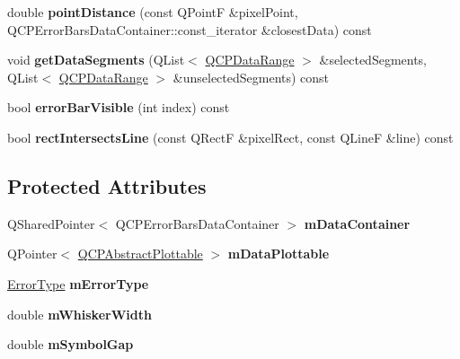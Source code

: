 \begin{DoxyCompactItemize}
\item 
\mbox{\label{classQCPErrorBars_a8e904076bad643f43af28b95f21c1b88}} 
double {\bfseries point\+Distance} (const Q\+PointF \&pixel\+Point, Q\+C\+P\+Error\+Bars\+Data\+Container\+::const\+\_\+iterator \&closest\+Data) const
\item 
\mbox{\label{classQCPErrorBars_a243e0bb2563fc2e9f08efd77e7175abf}} 
void {\bfseries get\+Data\+Segments} (Q\+List$<$ \hyperlink{classQCPDataRange}{Q\+C\+P\+Data\+Range} $>$ \&selected\+Segments, Q\+List$<$ \hyperlink{classQCPDataRange}{Q\+C\+P\+Data\+Range} $>$ \&unselected\+Segments) const
\item 
\mbox{\label{classQCPErrorBars_a5ad9abccb1be3df25485ad7dc21b3b89}} 
bool {\bfseries error\+Bar\+Visible} (int index) const
\item 
\mbox{\label{classQCPErrorBars_aa9b1642567a0aff8a2f6e0556c563633}} 
bool {\bfseries rect\+Intersects\+Line} (const Q\+RectF \&pixel\+Rect, const Q\+LineF \&line) const
\end{DoxyCompactItemize}
\subsection*{Protected Attributes}
\begin{DoxyCompactItemize}
\item 
\mbox{\label{classQCPErrorBars_a83c7f452d0eebd302a7e4fb3a1957634}} 
Q\+Shared\+Pointer$<$ Q\+C\+P\+Error\+Bars\+Data\+Container $>$ {\bfseries m\+Data\+Container}
\item 
\mbox{\label{classQCPErrorBars_a14b6a5b49295990da84a05a3a89026bb}} 
Q\+Pointer$<$ \hyperlink{classQCPAbstractPlottable}{Q\+C\+P\+Abstract\+Plottable} $>$ {\bfseries m\+Data\+Plottable}
\item 
\mbox{\label{classQCPErrorBars_af9fd3117b86aac728c9e8e87c406ed9a}} 
\hyperlink{classQCPErrorBars_a95f0220f11a72648b96480a85ce26474}{Error\+Type} {\bfseries m\+Error\+Type}
\item 
\mbox{\label{classQCPErrorBars_a3873724f7ac3392bdf9d46a47076a1d2}} 
double {\bfseries m\+Whisker\+Width}
\item 
\mbox{\label{classQCPErrorBars_a5cb5628b75e5aff0875710705666ec57}} 
double {\bfseries m\+Symbol\+Gap}
\end{DoxyCompactItemize}
